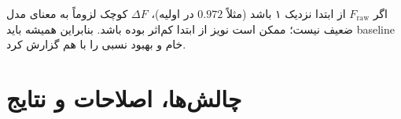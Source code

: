 اگر $F_{\mathrm{raw}}$ از ابتدا نزدیک ۱ باشد (مثلاً $0.972$ در  اولیه)، $\Delta F$ کوچک لزوماً به معنای مدل ضعیف نیست؛ ممکن است نویز از ابتدا کم‌اثر بوده باشد. بنابراین همیشه باید baseline خام و بهبود نسبی را با هم گزارش کرد.

%

\section*{چالش‌ها، اصلاحات و نتایج}

